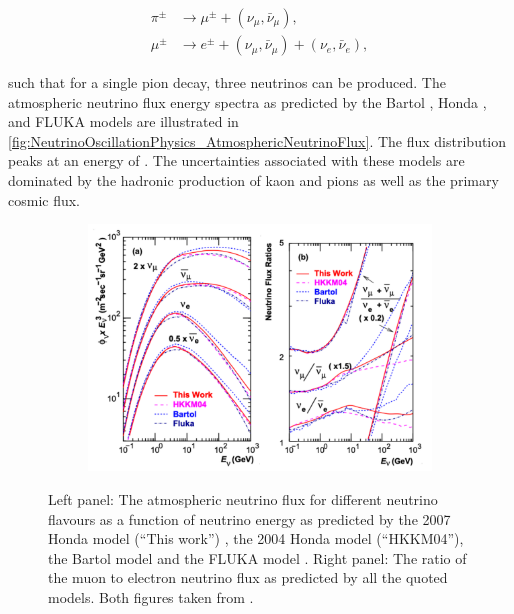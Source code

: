 \begin{equation}
  \label{eq:NeutrinoOscillationPhysics_PionDecay}
  \begin{split}
    \pi^{\pm} &\rightarrow \mu^{\pm} + (\nu_{\mu},\bar{\nu}_\mu), \\
    \mu^{\pm} &\rightarrow e^{\pm} + (\nu_{\mu},\bar{\nu}_\mu) + (\nu_{e},\bar{\nu}_e),
  \end{split}
\end{equation}

such that for a single pion decay, three neutrinos can be produced. The atmospheric neutrino flux energy spectra as predicted by the Bartol \cite{Barr_2004}, Honda \cite{Honda_2007, PhysRevD.70.043008, Honda:2011}, and FLUKA \cite{etde_20239111} models are illustrated in \autoref{fig:NeutrinoOscillationPhysics_AtmosphericNeutrinoFlux}. The flux distribution peaks at an energy of . The uncertainties associated with these models are dominated by the hadronic production of kaon and pions as well as the primary cosmic flux. 

\begin{figure}[h]
  \begin{subfigure}[t]{0.80\textwidth}
    \includegraphics[width=\textwidth, trim={0mm 0mm 0mm 0mm}, clip,page=1]{Figures/Theory/AtmosphericNuFlux.pdf}
  \end{subfigure}
  \caption{Left panel: The atmospheric neutrino flux for different neutrino flavours as a function of neutrino energy as predicted by the 2007 Honda model (``This work'') \cite{Honda_2007}, the 2004 Honda model (``HKKM04'')\cite{PhysRevD.70.043008}, the Bartol model \cite{Barr_2004} and the FLUKA model \cite{etde_20239111}. Right panel: The ratio of the muon to electron neutrino flux as predicted by all the quoted models. Both figures taken from \cite{Honda_2007}.}
  \label{fig:NeutrinoOscillationPhysics_AtmosphericNeutrinoFlux}
\end{figure}

